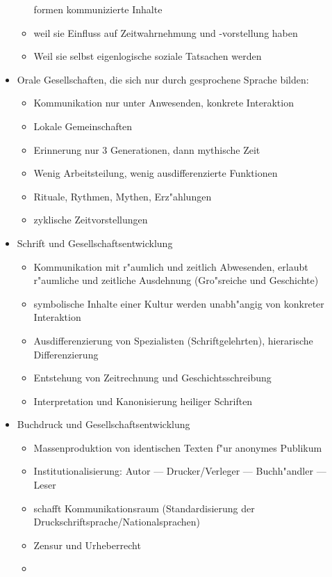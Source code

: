 \begin{itemize}
\begin{itemize}
				formen kommunizierte Inhalte
			\item
				weil sie Einfluss auf Zeitwahrnehmung und -vorstellung haben
			\item
				Weil sie selbst eigenlogische soziale Tatsachen werden
		\end{itemize}
	\item
		Orale Gesellschaften, die sich nur durch gesprochene Sprache bilden:
		\begin{itemize}
			\item
				Kommunikation nur unter Anwesenden, konkrete Interaktion
			\item
				Lokale Gemeinschaften
			\item
				Erinnerung nur 3 Generationen, dann mythische Zeit
			\item
				Wenig Arbeitsteilung, wenig ausdifferenzierte Funktionen
			\item
				Rituale, Rythmen, Mythen, Erz"ahlungen
			\item
				zyklische Zeitvorstellungen
		\end{itemize}
	\item
		Schrift und Gesellschaftsentwicklung
		\begin{itemize}
			\item
				Kommunikation mit r"aumlich und zeitlich Abwesenden, erlaubt r"aumliche und zeitliche Ausdehnung (Gro"sreiche und Geschichte)
			\item
				symbolische Inhalte einer Kultur werden unabh"angig von konkreter Interaktion
			\item
				Ausdifferenzierung von Spezialisten (Schriftgelehrten), hierarische Differenzierung
			\item
				Entstehung von Zeitrechnung und Geschichtsschreibung
			\item
				Interpretation und Kanonisierung heiliger Schriften
		\end{itemize}
	\item
		Buchdruck und Gesellschaftsentwicklung
		\begin{itemize}
			\item
				Massenproduktion von identischen Texten f"ur anonymes Publikum
			\item
				Institutionalisierung: Autor --- Drucker/Verleger --- Buchh"andler --- Leser
			\item
				schafft Kommunikationsraum (Standardisierung der Druckschriftsprache/Nationalsprachen)
			\item
				Zensur und Urheberrecht
			\item

\end{itemize}
\end{itemize}
